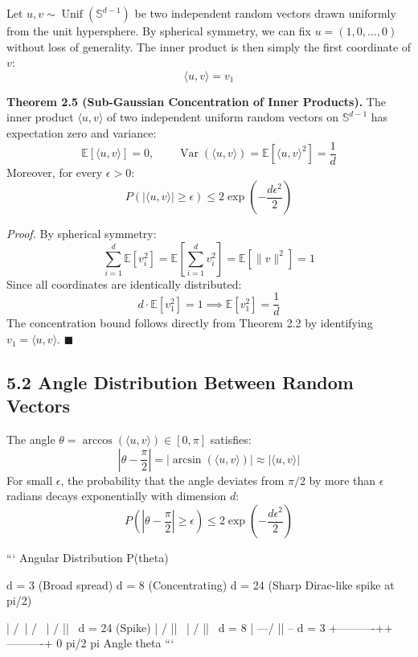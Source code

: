 \documentclass[11pt,twoside,openright]{amsbook}
\begin{document}
Let $u, v \sim \operatorname{Unif}(\mathbb{S}^{d-1})$ be two independent random vectors drawn uniformly from the unit hypersphere. By spherical symmetry, we can fix $u = (1, 0, \dots, 0)$ without loss of generality. The inner product is then simply the first coordinate of $v$:
$$\langle u, v \rangle = v_1$$

\textbf{Theorem 2.5 (Sub-Gaussian Concentration of Inner Products).} The inner product $\langle u, v \rangle$ of two independent uniform random vectors on $\mathbb{S}^{d-1}$ has expectation zero and variance:
$$\mathbb{E}[\langle u, v \rangle] = 0, \qquad \operatorname{Var}(\langle u, v \rangle) = \mathbb{E}[\langle u, v \rangle^2] = \frac{1}{d}$$
Moreover, for every $\epsilon > 0$:
$$P\left( |\langle u, v \rangle| \ge \epsilon \right) \le 2 \exp\left( - \frac{d \epsilon^2}{2} \right)$$

\textit{Proof.} By spherical symmetry:
$$\sum_{i=1}^d \mathbb{E}[v_i^2] = \mathbb{E}\left[ \sum_{i=1}^d v_i^2 \right] = \mathbb{E}[\|v\|^2] = 1$$
Since all coordinates are identically distributed:
$$d \cdot \mathbb{E}[v_1^2] = 1 \implies \mathbb{E}[v_1^2] = \frac{1}{d}$$
The concentration bound follows directly from Theorem 2.2 by identifying $v_1 = \langle u, v \rangle$. $\blacksquare$

\subsection{5.2 Angle Distribution Between Random Vectors}

The angle $\theta = \arccos(\langle u, v \rangle) \in [0, \pi]$ satisfies:
$$\left| \theta - \frac{\pi}{2} \right| = \left| \arcsin(\langle u, v \rangle) \right| \approx |\langle u, v \rangle|$$
For small $\epsilon$, the probability that the angle deviates from $\pi/2$ by more than $\epsilon$ radians decays exponentially with dimension $d$:
$$P\left( \left| \theta - \frac{\pi}{2} \right| \ge \epsilon \right) \le 2 \exp\left( - \frac{d \epsilon^2}{2} \right)$$

```
                         Angular Distribution P(theta)
                                       
                           d = 3 (Broad spread)
                           d = 8 (Concentrating)
                           d = 24 (Sharp Dirac-like spike at pi/2)
                                       
                            |          /\
                            |         /  \
                            |        / || \       d = 24 (Spike)
                            |       /  ||  \
                            |      /   ||   \     d = 8
                            |  ---/    ||    \--- d = 3
                            +----------++----------+
                            0         pi/2         pi
                                      Angle theta
```
\end{document}
